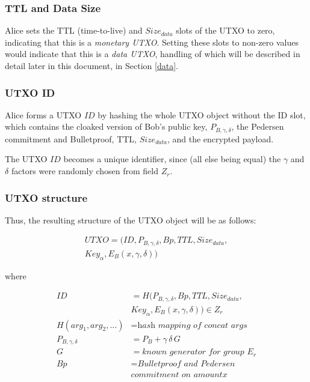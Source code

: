 \documentclass[a4paper, 10pt, conference]{ieeeconf}
\begin{document}
\subsubsection{TTL and Data Size} Alice sets the TTL (time-to-live) and $Size_{data}$ slots of the UTXO to zero, indicating that this is a \textit{monetary UTXO}. Setting these slots to non-zero values would indicate that this is a \textit{data UTXO}, handling of which will be described in detail later in this document, in Section \ref{data}.

\subsubsection{UTXO ID} Alice forms a UTXO $\mathit{ID}$ by hashing the whole UTXO object without the ID slot, which contains the cloaked version of Bob's public key, $P_{B, \gamma, \delta}$, the Pedersen commitment and Bulletproof, TTL, $Size_{data}$, and the encrypted payload.

The UTXO $\mathit{ID}$ becomes a unique identifier, since (all else being equal) the $\gamma$ and $\delta$ factors were randomly chosen from field $Z_r$.

\subsubsection{UTXO structure}

Thus, the resulting structure of the UTXO object will be as follows:

\begin{multline*}
UTXO = (ID, P_{B, \gamma, \delta}, Bp, TTL, Size_{data},\\
        Key_{\alpha}, E_B(x, \gamma, \delta))
\end{multline*}

where

\begin{align*}
ID &= H(P_{B, \gamma, \delta}, Bp, TTL, Size_{data}, \\ 
   & Key_{\alpha}, E_B(x, \gamma, \delta)) \in Z_r \\
H(arg_1, arg_2, ...) &= \textit{hash mapping of concat args} \\
P_{B, \gamma, \delta} &= P_B + \gamma \, \delta \, G \\
G &= \textit{known generator for group } E_r \\
Bp &= \textit{Bulletproof and Pedersen} \\
& \textit{commitment on amount} x 
\end{align*}
\end{document}
